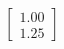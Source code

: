 \documentclass[preview]{standalone}
\begin{document}
\begin{align*}
\begin{bmatrix} 1.00 \\ 1.25 \end{bmatrix}
\end{align*}
\end{document}
